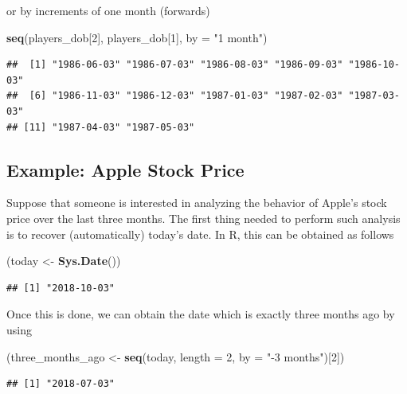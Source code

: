 \documentclass[12pt,]{krantz}
\newenvironment{Shaded}{\begin{snugshade}}{\end{snugshade}}
\newcommand{\KeywordTok}[1]{\textcolor[rgb]{0.27,0.27,0.27}{\textbf{#1}}}
\newcommand{\DataTypeTok}[1]{\textcolor[rgb]{0.27,0.27,0.27}{#1}}
\newcommand{\DecValTok}[1]{\textcolor[rgb]{0.06,0.06,0.06}{#1}}
\newcommand{\StringTok}[1]{\textcolor[rgb]{0.5,0.5,0.5}{#1}}
\newcommand{\NormalTok}[1]{#1}
\begin{document}
or by increments of one month (forwards)

\begin{Shaded}
\begin{Highlighting}[]
\KeywordTok{seq}\NormalTok{(players_dob[}\DecValTok{2}\NormalTok{], players_dob[}\DecValTok{1}\NormalTok{], }\DataTypeTok{by =} \StringTok{"1 month"}\NormalTok{)}
\end{Highlighting}
\end{Shaded}

\begin{verbatim}
##  [1] "1986-06-03" "1986-07-03" "1986-08-03" "1986-09-03" "1986-10-03"
##  [6] "1986-11-03" "1986-12-03" "1987-01-03" "1987-02-03" "1987-03-03"
## [11] "1987-04-03" "1987-05-03"
\end{verbatim}

\subsection{Example: Apple Stock Price}\label{example-apple-stock-price}

Suppose that someone is interested in analyzing the behavior of Apple's
stock price over the last three months. The first thing needed to
perform such analysis is to recover (automatically) today's date. In R,
this can be obtained as follows

\begin{Shaded}
\begin{Highlighting}[]
\NormalTok{(today <-}\StringTok{ }\KeywordTok{Sys.Date}\NormalTok{())}
\end{Highlighting}
\end{Shaded}

\begin{verbatim}
## [1] "2018-10-03"
\end{verbatim}

Once this is done, we can obtain the date which is exactly three months
ago by using

\begin{Shaded}
\begin{Highlighting}[]
\NormalTok{(three_months_ago <-}\StringTok{ }\KeywordTok{seq}\NormalTok{(today, }\DataTypeTok{length =} \DecValTok{2}\NormalTok{, }\DataTypeTok{by =} \StringTok{"-3 months"}\NormalTok{)[}\DecValTok{2}\NormalTok{])}
\end{Highlighting}
\end{Shaded}

\begin{verbatim}
## [1] "2018-07-03"
\end{verbatim}
\end{document}
